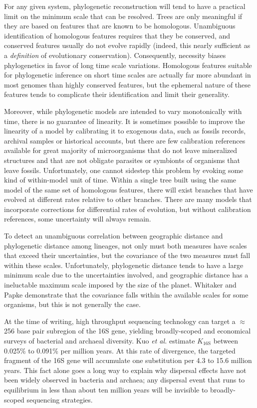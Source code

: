 For any given system, phylogenetic reconstruction will tend to have a practical limit on the minimum scale that can be resolved. Trees are only meaningful if they are based on features that are known to be homologous. Unambiguous identification of homologous features requires that they be conserved, and conserved features usually do not evolve rapidly (indeed, this nearly sufficient as a {\em definition} of evolutionary conservation). Consequently, necessity biases phylogenetics in favor of long time scale variations. Homologous features suitable for phylogenetic inference on short time scales are actually far more abundant in most genomes than highly conserved features, but the ephemeral nature of these features tends to complicate their identification and limit their generality. 

Moreover, while phylogenetic models are intended to vary monotonically with time, there is no guarantee of linearity. It is sometimes possible to improve the linearity of a model by calibrating it to exogenous data, such as fossils records, archival samples or historical accounts, but there are few calibration references available for great majority of microorganisms that do not leave mineralized structures and that are not obligate parasites or symbionts of organisms that leave fossils. Unfortunately, one cannot sidestep this problem by evoking some kind of within-model unit of time. Within a single tree built using the same model of the same set of homologous features, there will exist branches that have evolved at different rates relative to other branches. There are many models that incorporate corrections for differential rates of evolution, but without calibration references, some uncertainty will always remain.

To detect an unambiguous correlation between geographic distance and phylogenetic distance among lineages, not only must both measures have scales that exceed their uncertainties, but the covariance of the two measures must fall within these scales. Unfortunately, phylogenetic distance tends to have a large minimum scale due to the uncertainties involved, and geographic distance has a ineluctable maximum scale imposed by the size of the planet. Whitaker and Papke demonstrate that the covariance falls within the available scales for some organisms, but this is not generally the case.

At the time of writing, high throughput sequencing technology can target a $\approx$ 256 base pair subregion of the 16S gene, yielding broadly-scoped and economical surveys of bacterial and archaeal diversity. Kuo {\em et al.} estimate $K_{\mathrm{16S}}$ between 0.025\% to 0.091\% per million years. \cite{kuo2009inferring} At this rate of divergence, the targeted fragment of the 16S gene will accumulate one substitution per 4.3 to 15.6 million years. This fact alone goes a long way to explain why dispersal effects have not been widely observed in bacteria and archaea; any dispersal event that runs to equilibrium in less than about ten million years will be invisible to broadly-scoped sequencing strategies.

